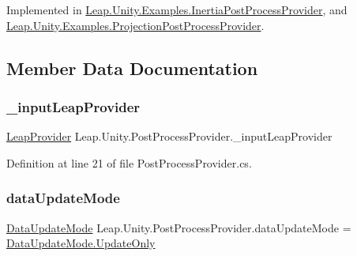 Implemented in \mbox{\hyperlink{class_leap_1_1_unity_1_1_examples_1_1_inertia_post_process_provider_af9c64ac46fd83f591cbbdb5e35e35213}{Leap.\+Unity.\+Examples.\+Inertia\+Post\+Process\+Provider}}, and \mbox{\hyperlink{class_leap_1_1_unity_1_1_examples_1_1_projection_post_process_provider_a967ec672c9d36c7141ecdb3dbf63b36c}{Leap.\+Unity.\+Examples.\+Projection\+Post\+Process\+Provider}}.



\subsection{Member Data Documentation}
\mbox{\label{class_leap_1_1_unity_1_1_post_process_provider_a72c564c19b906ee5c28a7c35765b515f}} 
\subsubsection{\texorpdfstring{\_inputLeapProvider}{\_inputLeapProvider}}
{\footnotesize\ttfamily \mbox{\hyperlink{class_leap_1_1_unity_1_1_leap_provider}{Leap\+Provider}} Leap.\+Unity.\+Post\+Process\+Provider.\+\_\+input\+Leap\+Provider\hspace{0.3cm}{\ttfamily [protected]}}



Definition at line 21 of file Post\+Process\+Provider.\+cs.

\mbox{\label{class_leap_1_1_unity_1_1_post_process_provider_a75af54a8ccf66c83f48a34e6394ff711}} 
\subsubsection{\texorpdfstring{dataUpdateMode}{dataUpdateMode}}
{\footnotesize\ttfamily \mbox{\hyperlink{class_leap_1_1_unity_1_1_post_process_provider_a00f92d69e8bdf46e32c5e8eda793e6c3}{Data\+Update\+Mode}} Leap.\+Unity.\+Post\+Process\+Provider.\+data\+Update\+Mode = \mbox{\hyperlink{class_leap_1_1_unity_1_1_post_process_provider_a00f92d69e8bdf46e32c5e8eda793e6c3a350c1257b699a10fa9f512f6e3b3a4fd}{Data\+Update\+Mode.\+Update\+Only}}}



